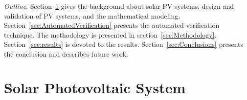 \documentclass[journal]{IEEEtran}
\begin{document}
%
 
\textit{Outline}. Section~\ref{sec:SolarPhotovoltaicSystem} gives the background about solar PV systems, design and validation of PV systems, and the mathematical modeling. Section~\ref{sec:AutomatedVerification} presents the automated verification technique. The methodology is presented in section~\ref{sec:Methodology}. Section~\ref{sec:results} is devoted to the results. Section~\ref{sec:Conclusions} presents the conclusion and describes future work.

\section{Solar Photovoltaic System }
\label{sec:SolarPhotovoltaicSystem}

\end{document}
